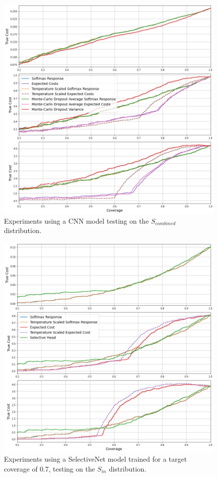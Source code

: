 \begin{figure}[H]
	\includegraphics[width=\textwidth]{images/binary/cnn_combine_distribution.png}
	\caption*{Experiments using a CNN model testing on the $S_{combined}$ distribution.}
\end{figure}

\begin{figure}[H]
	\includegraphics[width=\textwidth]{images/binary/sn0.7_in_distribution.png}
	\caption*{Experiments using a SelectiveNet model trained for a target coverage of 0.7, testing on the $S_{in}$ distribution.}
\end{figure}

